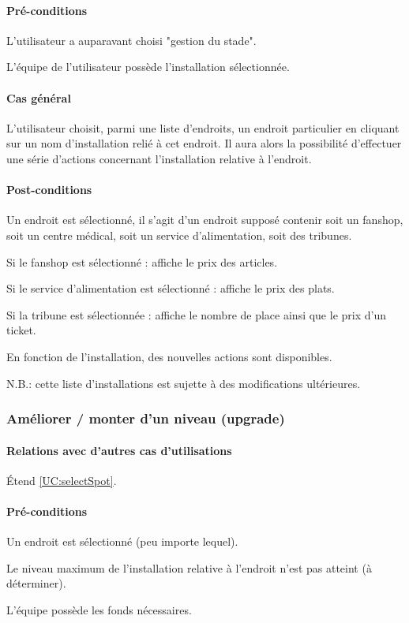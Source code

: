 \paragraph{Pré-conditions}
\begin{list}{}{\leftmargin=1.5em}
\item{L'utilisateur a auparavant choisi "gestion du stade".}
\item{L'équipe de l'utilisateur possède l'installation sélectionnée.}
\end{list}
\paragraph{Cas général}
L'utilisateur choisit, parmi une liste d'endroits, un endroit particulier en cliquant sur un nom d'installation relié à cet endroit. Il aura alors la possibilité d'effectuer une série d'actions concernant l'installation relative à l'endroit. 
\paragraph{Post-conditions}
\begin{list}{}{\leftmargin=1.5em}
\item{Un endroit est sélectionné, il s'agit d'un endroit supposé contenir soit un fanshop, soit un centre médical, soit un service d'alimentation, soit des tribunes.}
\item{Si le fanshop est sélectionné : affiche le prix des articles.}
\item{Si le service d'alimentation est sélectionné : affiche le prix des plats.}
\item{Si la tribune est sélectionnée : affiche le nombre de place ainsi que le prix d'un ticket.}
\item{En fonction de l'installation, des nouvelles actions sont disponibles.} 
\end{list}
N.B.: cette liste d'installations est sujette à des modifications ultérieures.

\subsubsection{Améliorer / monter d'un niveau (upgrade)}
\label{UC:upgrade}
\paragraph{Relations avec d'autres cas d'utilisations}
Étend \ref{UC:selectSpot}.
\paragraph{Pré-conditions}
\begin{list}{}{\leftmargin=1.5em}
\item{Un endroit est sélectionné (peu importe lequel).}
\item{Le niveau maximum de l'installation relative à l'endroit n'est pas atteint (à déterminer).}
\item{L'équipe possède les fonds nécessaires.}
\end{list}
